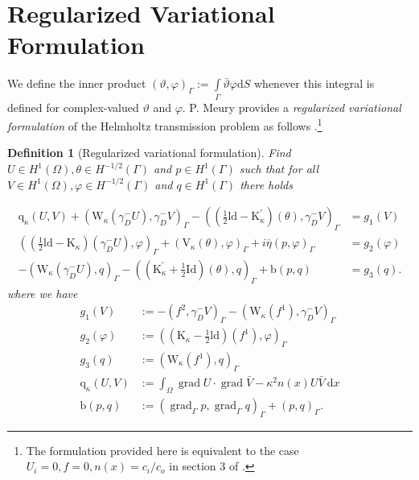 \documentclass[12pt,journal,compsoc, onecolumn]{IEEEtran}
\newtheorem{definition}[theorem]{Definition}
\begin{document}
\section{Regularized Variational Formulation}
\label{section:regularized_variational_formulation}
We define the inner product $(\vartheta, \varphi)_{\Gamma}:=\int\limits_{\Gamma} \bar{\vartheta} \varphi \mathrm{d} S$ whenever this integral is defined for complex-valued $\vartheta$ and $\varphi$.
P. Meury provides a \textit{regularized variational formulation} of the Helmholtz transmission problem as follows \cite{meury2007stable}.\footnote{The formulation provided here is equivalent to the case 
 $U_i = 0, f = 0, n(x) = c_i / c_o$ in section 3 of \cite{meury2007stable}.}
\begin{definition}[Regularized variational formulation]
    Find \(U \in H^{1}(\Omega), \theta \in H^{-1 / 2}(\Gamma)\) and \(p \in H^{1}(\Gamma)\) such that for all \(V \in H^{1}(\Omega), \varphi \in H^{-1 / 2}(\Gamma)\)
    and \(q \in H^{1}(\Gamma)\) there holds

    \begin{align}
        \mathrm{q}_{\kappa}(U, V)+\left(\mathrm{W}_{\kappa}\left(\gamma_{D}^{-} U\right), \gamma_{D}^{-} V\right)_{\Gamma}-\left(\left(\frac{1}{2} \mathrm{ld}-\mathrm{K}_{\kappa}^{\prime}\right)\left(\theta\right), \gamma_{D}^{-} V\right)_{\Gamma} &=g_1(V) \nonumber\\
        \left(\left(\frac{1}{2} \mathrm{ld}-\mathrm{K}_{\kappa}\right)\left(\gamma_{D}^{-} U\right), \varphi\right)_{\Gamma}+\left(\mathrm{V}_{\kappa}\left(\theta\right), \varphi\right)_{\Gamma}+i \overline{\eta}(p, \varphi)_{\Gamma} &={g_2(\varphi)} \label{eq:variational_formulation}\\
        -\left(\mathrm{W}_{\kappa}\left(\gamma_{D}^{-} U\right), q\right)_{\Gamma}-\left(\left(\mathrm{K}_{\kappa}^{\prime}+\frac{1}{2} \mathrm{Id}\right)(\theta), q\right)_{\Gamma}+\mathrm{b}(p, q) &=g_3(q). \nonumber
    \end{align}
    where we have 
    $$
    \begin{aligned} 
        g_1(V) &:=-\left(f^2, \gamma_{D}^{-} V\right)_{\Gamma}-\left(\mathrm{W}_{\kappa}\left(f^1\right), \gamma_{D}^{-} V\right)_{\Gamma} \\ 
        g_2(\varphi) &:=\left(\left(\mathrm{K}_{\kappa}-\frac{1}{2} \mathrm{ld}\right)\left(f^1\right), \varphi\right)_{\Gamma} \\ 
        g_3(q) &:=\left(\mathrm{W}_{\kappa}\left(f^1\right), q\right)_{\Gamma} \\ 
        \mathrm{q}_{\kappa}(U, V)& :=\int_{\Omega} \operatorname{grad} U \cdot \operatorname{grad} \bar{V}-\kappa^{2} n({x}) U \bar{V} \mathrm{~d} {x} \\
        \mathrm{b}(p, q)& :=\left(\operatorname{grad}_{\Gamma} p, \operatorname{grad}_{\Gamma} q\right)_{\Gamma}+(p, q)_{\Gamma}.
    \end{aligned}
    $$

\end{definition}  \noindent
\end{document}
